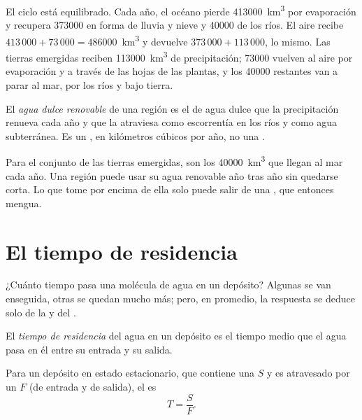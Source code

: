 El ciclo está equilibrado. Cada año, el océano pierde \num{413000}~\unit{km^3}
por evaporación y recupera \num{373000} en forma de lluvia y nieve y
\num{40000} de los ríos. El aire recibe $413\,000 + 73\,000 = \num{486000}$~\unit{km^3}
y devuelve $373\,000 + 113\,000$, lo mismo. Las tierras emergidas reciben
\num{113000}~\unit{km^3} de precipitación; \num{73000} vuelven al aire por
evaporación y a través de las hojas de las plantas, y los \num{40000}
restantes van a parar al mar, por los ríos y bajo tierra.

\begin{definition}\label{def:g10:freshwater-resources:renewable}
El \emph{agua dulce renovable} de una región es el
 de agua dulce que la precipitación renueva cada año y que la atraviesa
como escorrentía en los ríos y como agua subterránea. Es un , en
kilómetros cúbicos por año, no una .
\end{definition}

Para el conjunto de las tierras emergidas, son los \num{40000}~\unit{km^3} que
llegan al mar cada año. Una región puede usar su agua renovable año tras año
sin quedarse corta. Lo que tome por encima de ella solo puede salir de una
, que entonces mengua.

\section{El tiempo de residencia}

¿Cuánto tiempo pasa una molécula de agua en un depósito? Algunas se van
enseguida, otras se quedan mucho más; pero, en promedio, la respuesta se
deduce solo de la  y del .

\begin{definition}\label{def:g10:freshwater-resources:residence-time}
El \emph{tiempo de residencia} del agua en un
depósito es el tiempo medio que el agua pasa en él entre su entrada y su
salida.
\end{definition}

\begin{proposition}\label{prop:g10:freshwater-resources:residence}
Para un depósito en estado estacionario, que contiene una  $S$ y es
atravesado por un  $F$ (de entrada y de salida), el 
es
\[
T = \frac{S}{F}.
\]
\end{proposition}

